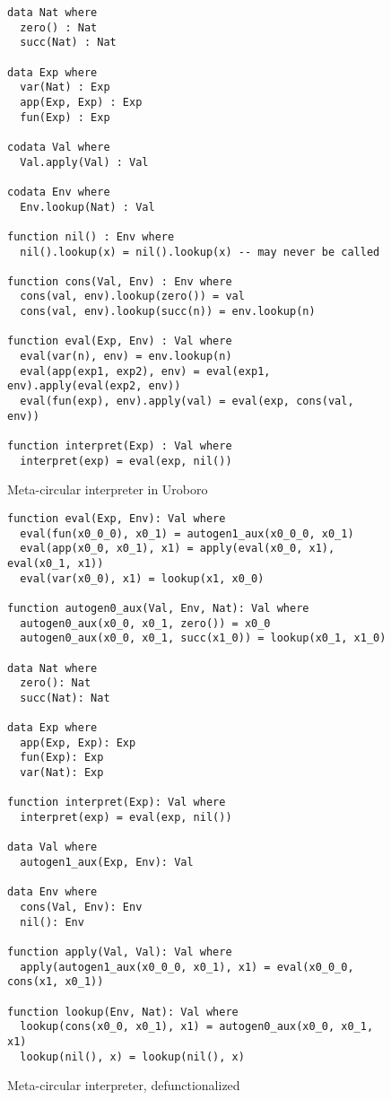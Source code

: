 \begin{figure}
\begin{lstlisting}
data Nat where
  zero() : Nat
  succ(Nat) : Nat

data Exp where
  var(Nat) : Exp
  app(Exp, Exp) : Exp
  fun(Exp) : Exp

codata Val where
  Val.apply(Val) : Val

codata Env where
  Env.lookup(Nat) : Val

function nil() : Env where
  nil().lookup(x) = nil().lookup(x) -- may never be called

function cons(Val, Env) : Env where
  cons(val, env).lookup(zero()) = val
  cons(val, env).lookup(succ(n)) = env.lookup(n)

function eval(Exp, Env) : Val where
  eval(var(n), env) = env.lookup(n)
  eval(app(exp1, exp2), env) = eval(exp1, env).apply(eval(exp2, env))
  eval(fun(exp), env).apply(val) = eval(exp, cons(val, env))

function interpret(Exp) : Val where
  interpret(exp) = eval(exp, nil())
\end{lstlisting}
\caption{Meta-circular interpreter in Uroboro}
\label{fig:mci}
\end{figure}

\begin{figure}

\begin{lstlisting}
function eval(Exp, Env): Val where
  eval(fun(x0_0_0), x0_1) = autogen1_aux(x0_0_0, x0_1)
  eval(app(x0_0, x0_1), x1) = apply(eval(x0_0, x1), eval(x0_1, x1))
  eval(var(x0_0), x1) = lookup(x1, x0_0)

function autogen0_aux(Val, Env, Nat): Val where
  autogen0_aux(x0_0, x0_1, zero()) = x0_0
  autogen0_aux(x0_0, x0_1, succ(x1_0)) = lookup(x0_1, x1_0)

data Nat where
  zero(): Nat
  succ(Nat): Nat

data Exp where
  app(Exp, Exp): Exp
  fun(Exp): Exp
  var(Nat): Exp

function interpret(Exp): Val where
  interpret(exp) = eval(exp, nil())

data Val where
  autogen1_aux(Exp, Env): Val

data Env where
  cons(Val, Env): Env
  nil(): Env

function apply(Val, Val): Val where
  apply(autogen1_aux(x0_0_0, x0_1), x1) = eval(x0_0_0, cons(x1, x0_1))

function lookup(Env, Nat): Val where
  lookup(cons(x0_0, x0_1), x1) = autogen0_aux(x0_0, x0_1, x1)
  lookup(nil(), x) = lookup(nil(), x)
\end{lstlisting}
\caption{Meta-circular interpreter, defunctionalized}
\label{fig:mcidefunced}
\end{figure}

